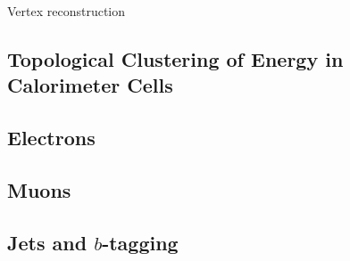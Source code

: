 Vertex reconstruction~\cite{PERF-2015-01}











\subsection{Topological Clustering of Energy in Calorimeter Cells}

\subsection{Electrons}

\subsection{Muons}

\subsection{Jets and $b$-tagging}

